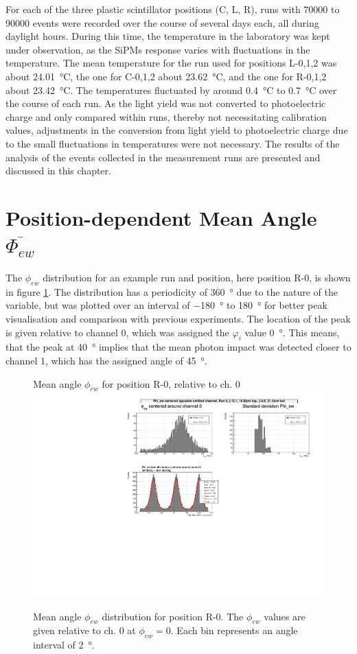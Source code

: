     For each of the three plastic scintillator positions (C, L, R), runs with \num{70000} to \num{90000} events were recorded over the course of several days each, all during daylight hours. During this time, the temperature in the laboratory was kept under observation, as the \acsp{SiPM} response varies with fluctuations in the temperature. The mean temperature for the run used for positions L-0,1,2 was about \SI{24.01}{\celsius}, the one for C-0,1,2 about \SI{23.62}{\celsius}, and the one for R-0,1,2 about \SI{23.42}{\celsius}. The temperatures fluctuated by around \SI{0.4}{\celsius} to \SI{0.7}{\celsius} over the course of each run. As the light yield was not converted to photoelectric charge and only compared within runs, thereby not necessitating calibration values, adjustments in the conversion from light yield to photoelectric charge due to the small fluctuations in temperatures were not necessary.
    The results of the analysis of the events collected in the measurement runs are presented and discussed in this chapter.

\section{Position-dependent Mean Angle \texorpdfstring{$\overline{\Phi_{ew}}$}{}}

	
	The $\phi_{ew}$ distribution for an example run and position, here position R-0, is shown in figure \ref{fig:phi-ew-R0}. The distribution has a periodicity of \SI{360}{\degree} due to the nature of the variable, but was plotted over an interval of \SI{-180}{\degree} to \SI{180}{\degree}  for better peak visualisation and comparison with previous experiments. The location of the peak is given relative to channel 0, which was assigned the $\varphi_i$ value \SI{0}{\degree}. This means, that the peak at \SI{40}{\degree} implies that the mean photon impact was detected closer to channel 1, which has the assigned angle of \SI{45}{\degree}.
	
	\begin{figure}[h!]
	    \centering
	    Mean angle $\phi_{ew}$ for position R-0, relative to ch. 0
	    \includegraphics[width=.9\textwidth]{pictures/phi_ew_R0.pdf}
	    \caption{Mean angle $\phi_{ew}$ distribution for position R-0. The $\phi_{ew}$ values are given relative to ch. 0 at $\phi_{ew} = 0$. Each bin represents an angle interval of \SI{2}{\degree}.}
	    \label{fig:phi-ew-R0}
	\end{figure}
	
